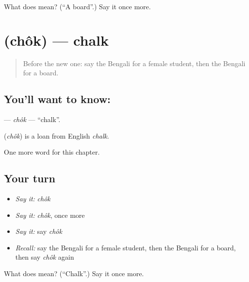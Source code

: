 \begin{tcolorbox}[breakable,colback=teal!4,colframe=teal!35!black,title={Before you move on}]
What does  mean? (\textquotedblleft{}A board\textquotedblright{}.) Say it once more.
\end{tcolorbox}
\section[\texorpdfstring{\bn{চক} (chôk)}{চক (chôk)}]{ (chôk) — chalk}

\label{lesson:BN-C172-chok}



\begin{quote}
Before the new one: say the Bengali for a female student, then the Bengali for a board.
\end{quote}

\subsection*{You'll want to know: }
\textbf{} — \emph{chôk} — \textquotedblleft{}chalk\textquotedblright{}.

\begin{cousinweb}
\textbf{} (\emph{chôk}) is a loan from English \emph{chalk}.
\end{cousinweb}

\begin{grammarlens}[title={What you've built}]
One more word for this chapter.
\end{grammarlens}

\subsection*{Your turn}
\begin{itemize}
\raggedright
  \item \emph{Say it:} \emph{chôk}
  \item \emph{Say it:} \emph{chôk}, once more
  \item \emph{Say it:} say \emph{chôk}
  \item \emph{Recall:} say the Bengali for a female student, then the Bengali for a board, then say \emph{chôk} again
\end{itemize}

\begin{tcolorbox}[breakable,colback=teal!4,colframe=teal!35!black,title={Before you move on}]
What does  mean? (\textquotedblleft{}Chalk\textquotedblright{}.) Say it once more.
\end{tcolorbox}
